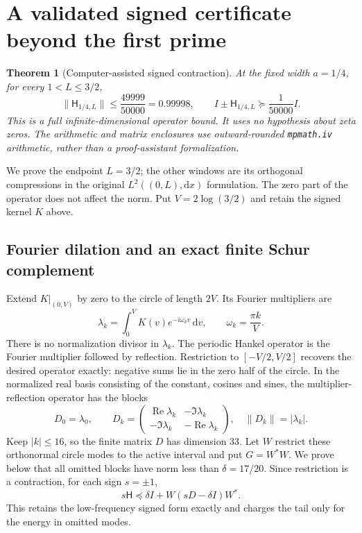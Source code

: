 \documentclass[11pt,letterpaper]{article}
\newtheorem{theorem}{Theorem}
\newcommand{\Rea}{\operatorname{Re}}
\newcommand{\dd}{\mathrm d}
\begin{document}
\section{A validated signed certificate beyond the first prime}
\begin{theorem}[Computer-assisted signed contraction]\label{thm:signed}
At the fixed width $a=1/4$, for every $1<L\leq3/2$,
\[
 \|\mathsf H_{1/4,L}\|\leq\frac{49999}{50000}=0.99998,
 \qquad I\pm\mathsf H_{1/4,L}\succeq\frac1{50000}I.
\]
This is a full infinite-dimensional operator bound. It uses no hypothesis about zeta zeros. The arithmetic and matrix enclosures use outward-rounded \texttt{mpmath.iv} arithmetic, rather than a proof-assistant formalization.
\end{theorem}
We prove the endpoint $L=3/2$; the other windows are its orthogonal compressions in the original $L^2((0,L),\dd x)$ formulation. The zero part of the operator does not affect the norm. Put $V=2\log(3/2)$ and retain the signed kernel $K$ above.

\subsection*{Fourier dilation and an exact finite Schur complement}
Extend $K|_{(0,V)}$ by zero to the circle of length $2V$. Its Fourier multipliers are
\[
 \lambda_k=\int_0^V K(v)e^{-i\omega_kv}\,\dd v,
 \qquad \omega_k=\frac{\pi k}{V}.
\]
There is no normalization divisor in $\lambda_k$. The periodic Hankel operator is the Fourier multiplier followed by reflection. Restriction to $[-V/2,V/2]$ recovers the desired operator exactly: negative sums lie in the zero half of the circle. In the normalized real basis consisting of the constant, cosines and sines, the multiplier-reflection operator has the blocks
\[
 D_0=\lambda_0,\qquad
 D_k=\begin{pmatrix}\Rea\lambda_k&-\Im\lambda_k\\-\Im\lambda_k&-\Rea\lambda_k\end{pmatrix},
 \quad \|D_k\|=|\lambda_k|.
\]
Keep $|k|\leq16$, so the finite matrix $D$ has dimension 33. Let $W$ restrict these orthonormal circle modes to the active interval and put $G=W^*W$. We prove below that all omitted blocks have norm less than $\delta=17/20$. Since restriction is a contraction, for each sign $s=\pm1$,
\begin{equation}\label{eq:majorant}
 s\mathsf H\preceq \delta I+W(sD-\delta I)W^*.
\end{equation}
This retains the low-frequency signed form exactly and charges the tail only for the energy in omitted modes.
\end{document}
